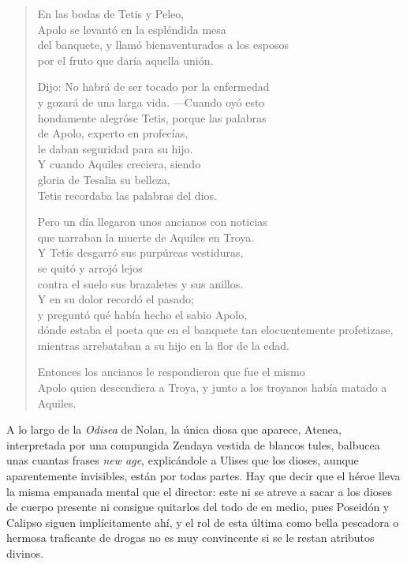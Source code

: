 \documentclass[11pt,a4paper]{article}
\begin{document}
\begin{verse}
En las bodas de Tetis y Peleo,\\
Apolo se levantó en la espléndida mesa\\
del banquete, y llamó bienaventurados a los esposos\\
por el fruto que daría aquella unión.

Dijo: No habrá de ser tocado por la enfermedad\\
y gozará de una larga vida. ---Cuando oyó esto\\
hondamente alegróse Tetis, porque las palabras\\
de Apolo, experto en profecías,\\
le daban seguridad para su hijo.\\
Y cuando Aquiles creciera, siendo\\
gloria de Tesalia su belleza,\\
Tetis recordaba las palabras del dios.

Pero un día llegaron unos ancianos con noticias\\
que narraban la muerte de Aquiles en Troya.\\
Y Tetis desgarró sus purpúreas vestiduras,\\
se quitó y arrojó lejos\\
contra el suelo sus brazaletes y sus anillos.\\
Y en su dolor recordó el pasado;\\
y preguntó qué había hecho el sabio Apolo,\\
dónde estaba el poeta que en el banquete tan elocuentemente profetizase,\\
mientras arrebataban a su hijo en la flor de la edad.

Entonces los ancianos le respondieron que fue el mismo\\
Apolo quien descendiera a Troya, y junto a los troyanos había matado a Aquiles.
\end{verse}


A lo largo de la \emph{Odisea} de Nolan, la única diosa que aparece, Atenea, interpretada por una compungida Zendaya vestida de blancos tules, balbucea unas cuantas frases \emph{new age}, explicándole a Ulises que los dioses, aunque aparentemente invisibles, están por todas partes. Hay que decir que el héroe lleva la misma empanada mental que el director: este ni se atreve a sacar a los dioses de cuerpo presente ni consigue quitarlos del todo de en medio, pues Poseidón y Calipso siguen implícitamente ahí, y el rol de esta última como bella pescadora o hermosa traficante de drogas no es muy convincente si se le restan atributos divinos.
\end{document}
